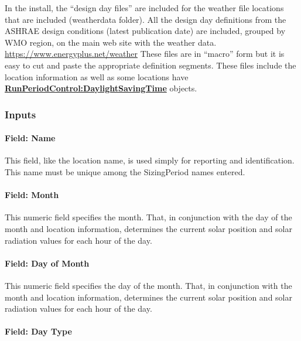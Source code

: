 \begin{callout}
  In the install, the ``design day files'' are included for the weather file locations that are included (weatherdata folder). All the design day definitions from the ASHRAE design conditions (latest publication date) are included, grouped by WMO region, on the main web site with the weather data. \url{https://www.energyplus.net/weather} These files are in ``macro'' form but it is easy to cut and paste the appropriate definition segments. These files include the location information as well as some locations have \textbf{\hyperref[runperiodcontroldaylightsavingtime]{RunPeriodControl:DaylightSavingTime}} objects.
\end{callout}

\subsubsection{Inputs}\label{inputs-1-024}

\paragraph{Field: Name}\label{field-name-1-023}

This field, like the location name, is used simply for reporting and identification. This name must be unique among the SizingPeriod names entered.

\paragraph{Field: Month}\label{field-month}

This numeric field specifies the month. That, in conjunction with the day of the month and location information, determines the current solar position and solar radiation values for each hour of the day.

\paragraph{Field: Day of Month}\label{field-day-of-month}

This numeric field specifies the day of the month. That, in conjunction with the month and location information, determines the current solar position and solar radiation values for each hour of the day.

\paragraph{Field: Day Type}\label{field-day-type}

